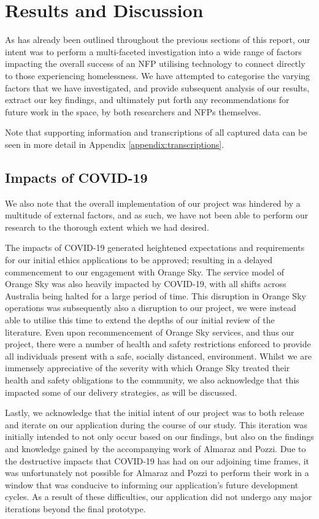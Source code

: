 \chapter{Results and Discussion}

As has already been outlined throughout the previous sections of this report, our intent was to perform a multi-faceted investigation into a wide range of factors impacting the overall success of an NFP utilising technology to connect directly to those experiencing homelessness. We have attempted to categorise the varying factors that we have investigated, and provide subsequent analysis of our results, extract our key findings, and ultimately put forth any recommendations for future work in the space, by both researchers and NFPs themselves.

Note that supporting information and transcriptions of all captured data can be seen in more detail in Appendix \ref{appendix:transcriptions}.

\section{Impacts of COVID-19}

We also note that the overall implementation of our project was hindered by a multitude of external factors, and as such, we have not been able to perform our research to the thorough extent which we had desired.

The impacts of COVID-19 generated heightened expectations and requirements for our initial ethics applications to be approved; resulting in a delayed commencement to our engagement with Orange Sky. The service model of Orange Sky was also heavily impacted by COVID-19, with all shifts across Australia being halted for a large period of time. This disruption in Orange Sky operations was subsequently also a disruption to our project, we were instead able to utilise this time to extend the depths of our initial review of the literature. Even upon recommencement of Orange Sky services, and thus our project, there were a number of health and safety restrictions enforced to provide all individuals present with a safe, socially distanced, environment. Whilst we are immensely appreciative of the severity with which Orange Sky treated their health and safety obligations to the community, we also acknowledge that this impacted some of our delivery strategies, as will be discussed.

Lastly, we acknowledge that the initial intent of our project was to both release and iterate on our application during the course of our study. This iteration was initially intended to not only occur based on our findings, but also on the findings and knowledge gained by the accompanying work of Almaraz and Pozzi. Due to the destructive impacts that COVID-19 has had on our adjoining time frames, it was unfortunately not possible for Almaraz and Pozzi to perform their work in a window that was conducive to informing our application's future development cycles. As a result of these difficulties, our application did not undergo any major iterations beyond the final prototype.

